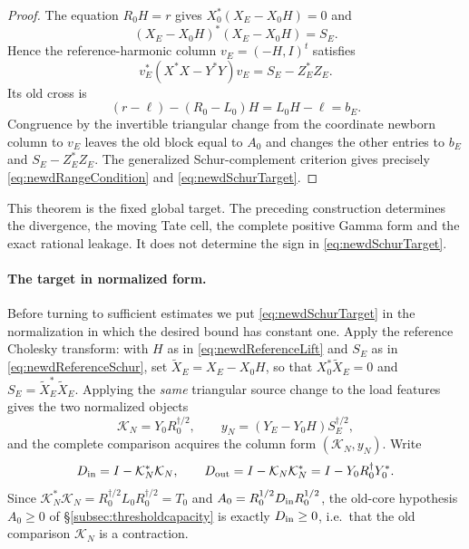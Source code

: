 \documentclass[11pt]{amsart}
\theoremstyle{definition}
\theoremstyle{remark}
\begin{document}
\begin{proof}
The equation $R_0H=r$ gives
$X_0^*(X_E-X_0H)=0$ and
\[
 (X_E-X_0H)^*(X_E-X_0H)=S_E.
\]
Hence the reference-harmonic column $v_E=(-H,I)^t$ satisfies
\[
 v_E^*(X^*X-Y^*Y)v_E=S_E-Z_E^*Z_E.
\]
Its old cross is
\[
 (r-\ell)-(R_0-L_0)H=L_0H-\ell=b_E.
\]
Congruence by the invertible triangular change from the coordinate newborn
column to $v_E$ leaves the old block equal to $A_0$ and changes the other
entries to $b_E$ and $S_E-Z_E^*Z_E$.  The generalized Schur-complement
criterion gives precisely \eqref{eq:newdRangeCondition} and
\eqref{eq:newdSchurTarget}.
\end{proof}

This theorem is the fixed global target.  The preceding construction
determines the divergence, the moving Tate cell, the complete positive Gamma
form and the exact rational leakage.  It does not determine the sign in
\eqref{eq:newdSchurTarget}.

\paragraph{The target in normalized form.}
Before turning to sufficient estimates we put \eqref{eq:newdSchurTarget} in
the normalization in which the desired bound has constant one.  Apply the
reference Cholesky transform: with \(H\) as in
\eqref{eq:newdReferenceLift} and \(S_E\) as in \eqref{eq:newdReferenceSchur},
set \(\widetilde X_E=X_E-X_0H\), so that \(X_0^*\widetilde X_E=0\) and
\(S_E=\widetilde X_E^*\widetilde X_E\).  Applying the \emph{same} triangular
source change to the load features gives the two normalized objects
\begin{equation}\label{eq:newdNormalizedComparison}
 \mathcal K_N=Y_0R_0^{\dagger/2},
 \qquad
 y_N=(Y_E-Y_0H)S_E^{\dagger/2},
\end{equation}
and the complete comparison acquires the column form \((\mathcal K_N,y_N)\).
Write
\begin{equation}\label{eq:newdInOutDefects}
 D_{\rm in}=I-\mathcal K_N^*\mathcal K_N,
 \qquad
 D_{\rm out}=I-\mathcal K_N\mathcal K_N^*
            =I-Y_0R_0^\dagger Y_0^* .
\end{equation}
Since \(\mathcal K_N^*\mathcal K_N=R_0^{\dagger/2}L_0R_0^{\dagger/2}=T_0\) and
\(A_0=R_0^{1/2}D_{\rm in}R_0^{1/2}\), the old-core hypothesis \(A_0\ge0\) of
\S\ref{subsec:thresholdcapacity} is exactly \(D_{\rm in}\ge0\), i.e.\ that the
old comparison \(\mathcal K_N\) is a contraction.
\end{document}

